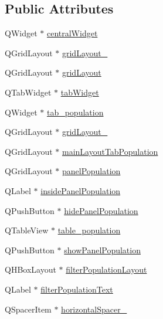 \subsection*{Public Attributes}
\begin{DoxyCompactItemize}
\item 
Q\+Widget $\ast$ \hyperlink{class_ui___g_a___viz_a33f157c94f1d5c2784584744525885c2}{central\+Widget}
\item 
Q\+Grid\+Layout $\ast$ \hyperlink{class_ui___g_a___viz_a243ced702d44a5535b1cfe10376b2a8f}{grid\+Layout\+\_}
\item 
Q\+Grid\+Layout $\ast$ \hyperlink{class_ui___g_a___viz_a862566668a42abbdbbcfc174784ab60b}{grid\+Layout}
\item 
Q\+Tab\+Widget $\ast$ \hyperlink{class_ui___g_a___viz_a1b212ffec66f6321f5409f21a2becdb7}{tab\+Widget}
\item 
Q\+Widget $\ast$ \hyperlink{class_ui___g_a___viz_a35316a20ada871060401230fcc61da27}{tab\+\_\+population}
\item 
Q\+Grid\+Layout $\ast$ \hyperlink{class_ui___g_a___viz_a5e10f3ef5fb9c911ad0268811fa32927}{grid\+Layout\+\_}
\item 
Q\+Grid\+Layout $\ast$ \hyperlink{class_ui___g_a___viz_a97ad4805295b48f35895e88862c0af75}{main\+Layout\+Tab\+Population}
\item 
Q\+Grid\+Layout $\ast$ \hyperlink{class_ui___g_a___viz_a653e6afad49ffca60978c90c1fa68a1b}{panel\+Population}
\item 
Q\+Label $\ast$ \hyperlink{class_ui___g_a___viz_ad4d0f203ecfd9f8866bfc16eab7c4757}{inside\+Panel\+Population}
\item 
Q\+Push\+Button $\ast$ \hyperlink{class_ui___g_a___viz_abbadebd50c242f75db43fc2b17b79734}{hide\+Panel\+Population}
\item 
Q\+Table\+View $\ast$ \hyperlink{class_ui___g_a___viz_a744c6557f83bbe09d9bddd195e2337b9}{table\+\_\+population}
\item 
Q\+Push\+Button $\ast$ \hyperlink{class_ui___g_a___viz_a26d8f319d5b328961449aa67b761c3fd}{show\+Panel\+Population}
\item 
Q\+H\+Box\+Layout $\ast$ \hyperlink{class_ui___g_a___viz_af62ea06a1c8635c28e505cc63da1807f}{filter\+Population\+Layout}
\item 
Q\+Label $\ast$ \hyperlink{class_ui___g_a___viz_ad0f15befab8ff451b22ef4d71463f91b}{filter\+Population\+Text}
\item 
Q\+Spacer\+Item $\ast$ \hyperlink{class_ui___g_a___viz_a309487aa4f6bc552952db3feb20aac2c}{horizontal\+Spacer\+\_}

\end{DoxyCompactItemize}
